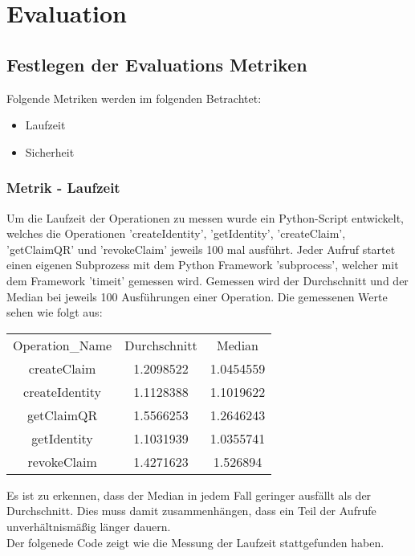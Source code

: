 \chapter{Evaluation}
\label{cha:evaluation}

\section{Festlegen der Evaluations Metriken}
Folgende Metriken werden im folgenden Betrachtet:
\begin{itemize}
	\item Laufzeit
	\item Sicherheit
\end{itemize}
\subsection{Metrik - Laufzeit}
Um die Laufzeit der Operationen zu messen wurde ein Python-Script entwickelt, welches die Operationen 'createIdentity', 'getIdentity', 'createClaim', 'getClaimQR' und 'revokeClaim' jeweils 100 mal ausführt. Jeder Aufruf startet einen eigenen Subprozess mit dem Python Framework 'subprocess', welcher mit dem Framework 'timeit' gemessen wird. Gemessen wird der Durchschnitt und der Median bei jeweils 100 Ausführungen einer Operation. Die gemessenen Werte sehen wie folgt aus:

\begin{center}
	\begin{tabular}{ c c c }
		Operation\_Name 	& Durchschnitt	& Median 		\\
		createClaim 		& 1.2098522 	& 1.0454559 	\\
		createIdentity 		& 1.1128388 	& 1.1019622  	\\
		getClaimQR 			& 1.5566253 	& 1.2646243 	\\
		getIdentity			& 1.1031939 	& 1.0355741 	\\
		revokeClaim 		& 1.4271623 	& 1.526894 		\\
	\end{tabular}
\end{center}
Es ist zu erkennen, dass der Median in jedem Fall geringer ausfällt als der Durchschnitt. Dies muss damit zusammenhängen, dass ein Teil der Aufrufe unverhältnismäßig länger dauern.\\

Der folgenede Code zeigt wie die Messung der Laufzeit stattgefunden haben.

